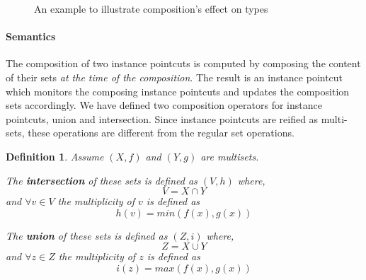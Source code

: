 \documentclass{acm_proc_article-sp}
\newtheorem{mydef}{Definition}
\begin{document}
\begin{figure}%
\centering
{}
\hspace{40pt}
\vspace{10pt}
\caption{An example to illustrate composition's effect on types}
\label{fig:compotypes}
\end{figure}


\paragraph{Semantics}
The composition of two instance pointcuts is computed by composing the content of their sets \emph{at the time of the composition}. The result is an instance pointcut which monitors the composing instance pointcuts and updates the composition sets accordingly. We have defined two composition operators for instance pointcuts, union and intersection. Since instance pointcuts are reified as multi-sets, these operations are different from the regular set operations.

\begin{mydef}
\label{def:inun}
Assume $(X, f)$ and $(Y, g)$ are multisets. 

The \textbf{intersection} of these sets is defined as $(V, h)$ where, 
\[V = X \cap Y\] and
$\forall v \in V$ the multiplicity of $v$ is defined as \[h(v) =  min(f(x),g(x))\]

The \textbf{union} of these sets is defined as $(Z, i)$ where, 
\[Z = X \cup Y\] and
$\forall z \in Z$ the multiplicity of $z$ is defined as \[i(z) =  max(f(x),g(x))\]
\end{mydef}
\end{document}

